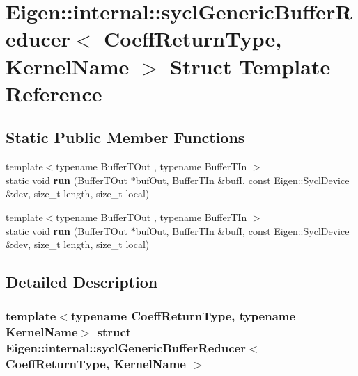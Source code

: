 \hypertarget{struct_eigen_1_1internal_1_1sycl_generic_buffer_reducer}{}\section{Eigen\+:\+:internal\+:\+:sycl\+Generic\+Buffer\+Reducer$<$ Coeff\+Return\+Type, Kernel\+Name $>$ Struct Template Reference}
\label{struct_eigen_1_1internal_1_1sycl_generic_buffer_reducer}
\subsection*{Static Public Member Functions}
\begin{DoxyCompactItemize}
\item 
\mbox{\label{struct_eigen_1_1internal_1_1sycl_generic_buffer_reducer_a1e5ae4cfe38806b0ed52dfdb42aaa195}} 
{\footnotesize template$<$typename Buffer\+T\+Out , typename Buffer\+T\+In $>$ }\\static void {\bfseries run} (Buffer\+T\+Out $\ast$buf\+Out, Buffer\+T\+In \&bufI, const Eigen\+::\+Sycl\+Device \&dev, size\+\_\+t length, size\+\_\+t local)
\item 
\mbox{\label{struct_eigen_1_1internal_1_1sycl_generic_buffer_reducer_a1e5ae4cfe38806b0ed52dfdb42aaa195}} 
{\footnotesize template$<$typename Buffer\+T\+Out , typename Buffer\+T\+In $>$ }\\static void {\bfseries run} (Buffer\+T\+Out $\ast$buf\+Out, Buffer\+T\+In \&bufI, const Eigen\+::\+Sycl\+Device \&dev, size\+\_\+t length, size\+\_\+t local)
\end{DoxyCompactItemize}


\subsection{Detailed Description}
\subsubsection*{template$<$typename Coeff\+Return\+Type, typename Kernel\+Name$>$\newline
struct Eigen\+::internal\+::sycl\+Generic\+Buffer\+Reducer$<$ Coeff\+Return\+Type, Kernel\+Name $>$}



